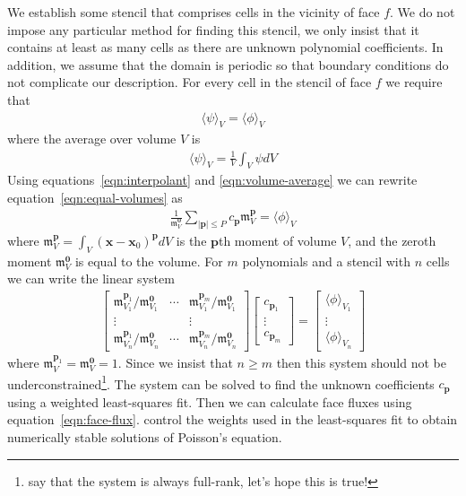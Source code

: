 \documentclass{article}
\newcommand{\Mag}[1]{\lvert #1 \rvert}
\newcommand{\vect}{\mathbf}
\newcommand{\moment}{\mathfrak{m}}
\begin{document}
We establish some stencil that comprises cells in the vicinity of face $f$.  We do not impose any particular method for finding this stencil, we only insist that it contains at least as many cells as there are unknown polynomial coefficients.  In addition, we assume that the domain is periodic so that boundary conditions do not complicate our description.  For every cell in the stencil of face $f$ we require that
\begin{align}
	\langle \psi \rangle_V = \langle \phi \rangle_V \label{eqn:equal-volumes}
\end{align}
where the average over volume $V$ is
\begin{align}
	\langle \psi \rangle_V = \frac{1}{V} \int_V \psi dV \label{eqn:volume-average}
\end{align}
Using equations~\eqref{eqn:interpolant} and \eqref{eqn:volume-average} we can rewrite equation~\eqref{eqn:equal-volumes} as
\begin{align}
	\frac{1}{\moment_V^\vect{0}} \sum_{\Mag{\vect{p}} \leq P} c_\vect{p} \moment_V^\vect{p} = \langle \phi \rangle_V
\end{align}
where $\moment_V^\vect{p} = \int_V \left( \vect{x} - \vect{x}_0 \right)^\vect{p} dV$ is the $\vect{p}$th moment of volume $V$, and the zeroth moment $\moment_V^\vect{0}$ is equal to the volume.
For $m$ polynomials and a stencil with $n$ cells we can write the linear system
\begin{align}
	\begin{bmatrix}
		\moment_{V_1}^{\vect{p}_1}/\moment_{V_1}^\vect{0} & \cdots & \moment_{V_1}^{\vect{p}_m}/\moment_{V_1}^\vect{0} \\
		\vdots & & \vdots \\
		\moment_{V_n}^{\vect{p}_1}/\moment_{V_n}^\vect{0} & \cdots & \moment_{V_n}^{\vect{p}_m}/\moment_{V_n}^\vect{0}
	\end{bmatrix}
	\begin{bmatrix}
		c_{\vect{p}_1} \\
		\vdots \\
		c_{\vect{p}_m}
	\end{bmatrix}
	=
	\begin{bmatrix}
		\langle \phi \rangle_{V_1} \\
		\vdots \\
		\langle \phi \rangle_{V_n}
	\end{bmatrix}
\end{align}
where $\moment_V^{\vect{p}_1} = \moment_V^{\vect{0}} = 1$.
Since we insist that $n \geq m$ then this system should not be underconstrained\footnote{\citet{devendran2014} say that the system is always full-rank, let's hope this is true!}.  The system can be solved to find the unknown coefficients $c_\vect{p}$ using a weighted least-squares fit.  Then we can calculate face fluxes using equation~\eqref{eqn:face-flux}.  \citet{devendran2014} control the weights used in the least-squares fit to obtain numerically stable solutions of Poisson's equation.



\end{document}
